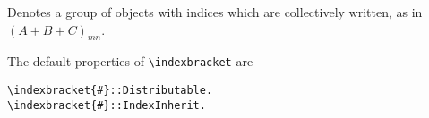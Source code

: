 
Denotes a group of objects with indices which are collectively
written, as in~\mbox{$(A + B + C)_{m n}$}.

The default properties of \verb|\indexbracket| are
\begin{verbatim}
\indexbracket{#}::Distributable.
\indexbracket{#}::IndexInherit.
\end{verbatim}
~


